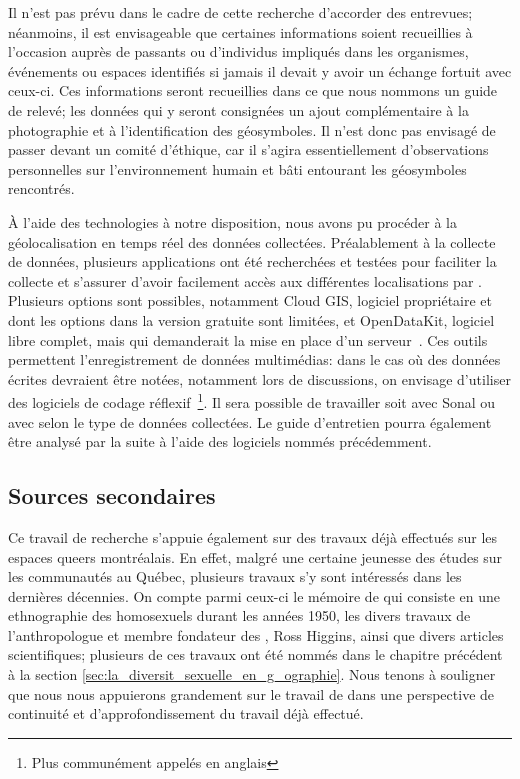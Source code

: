 Il n'est pas prévu dans le cadre de cette recherche d'accorder des entrevues; néanmoins, il est envisageable que certaines informations soient recueillies à l'occasion auprès de passants ou d'individus impliqués dans les organismes, événements ou espaces identifiés si jamais il devait y avoir un échange fortuit avec ceux-ci.
Ces informations seront recueillies dans ce que nous nommons un guide de relevé; les données qui y seront consignées un ajout complémentaire à la photographie et à l'identification des géosymboles.
Il n'est donc pas envisagé de passer devant un comité d'éthique, car il s'agira essentiellement d'observations personnelles sur l'environnement humain et bâti entourant les géosymboles rencontrés.

À l'aide des technologies à notre disposition, nous avons pu procéder à la géolocalisation en temps réel des données collectées.
Préalablement à la collecte de données, plusieurs applications ont été recherchées et testées pour faciliter la collecte et s'assurer d'avoir facilement accès aux différentes localisations par \gps.
Plusieurs options sont possibles, notamment Cloud GIS, logiciel propriétaire et dont les options dans la version gratuite sont limitées, et OpenDataKit, logiciel libre complet, mais qui demanderait la mise en place d'un serveur~\citep{OpenDataKit2014}.
Ces outils permettent l'enregistrement de données multimédias: dans le cas où des données écrites devraient être notées, notamment lors de discussions, on envisage d'utiliser des logiciels de codage réflexif~\footnote{Plus communément appelés en anglais \cadqas}.
Il sera possible de travailler soit avec Sonal ou avec \rqda{} selon le type de données collectées.
Le guide d'entretien pourra également être analysé par la suite à l'aide des logiciels nommés précédemment.

\subsection{Sources secondaires}
\label{sub:sources_secondaires}
Ce travail de recherche s'appuie également sur des travaux déjà effectués sur les espaces queers montréalais.
En effet, malgré une certaine jeunesse des études sur les communautés \lgbt{} au Québec, plusieurs travaux s'y sont intéressés dans les dernières décennies.
On compte parmi ceux-ci le mémoire de \cite{Leznoff1954} qui consiste en une ethnographie des homosexuels durant les années 1950, les divers travaux de l'anthropologue et membre fondateur des \agq{}, Ross Higgins, ainsi que divers articles scientifiques; plusieurs de ces travaux ont été nommés dans le chapitre précédent à la section \ref{sec:la_diversit_sexuelle_en_g_ographie}.
Nous tenons à souligner que nous nous appuierons grandement sur le travail de \citep{Giraud2014} dans une perspective de continuité et d'approfondissement du travail déjà effectué.

